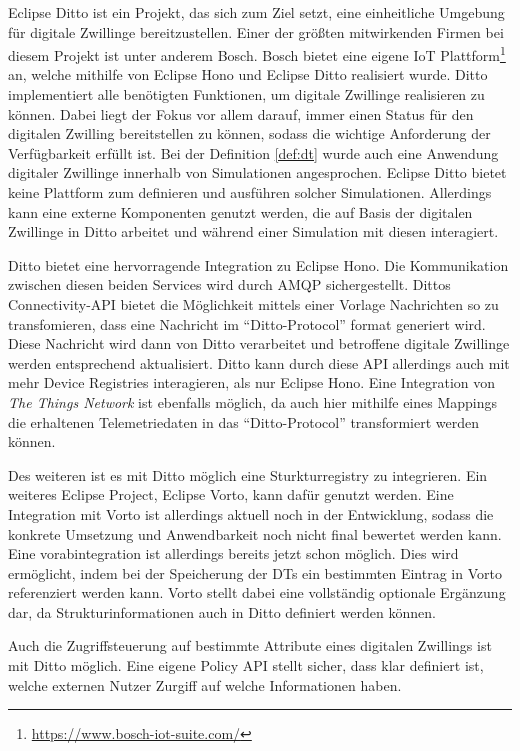 Eclipse Ditto ist ein Projekt, das sich zum Ziel setzt, eine einheitliche Umgebung für digitale Zwillinge bereitzustellen. Einer der größten mitwirkenden Firmen bei diesem Projekt ist unter anderem Bosch. Bosch bietet eine eigene IoT Plattform\footnote{\url{https://www.bosch-iot-suite.com/}} an, welche mithilfe von Eclipse Hono und Eclipse Ditto realisiert wurde. Ditto implementiert alle benötigten Funktionen, um digitale Zwillinge realisieren zu können. Dabei liegt der Fokus vor allem darauf, immer einen Status für den digitalen Zwilling bereitstellen zu können, sodass die wichtige Anforderung der Verfügbarkeit erfüllt ist. Bei der Definition \vref{def:dt} wurde auch eine Anwendung digitaler Zwillinge innerhalb von Simulationen angesprochen. Eclipse Ditto bietet keine Plattform zum definieren und ausführen solcher Simulationen. Allerdings kann eine externe Komponenten genutzt werden, die auf Basis der digitalen Zwillinge in Ditto arbeitet und während einer Simulation mit diesen interagiert.

Ditto bietet eine hervorragende Integration zu Eclipse Hono. Die Kommunikation zwischen diesen beiden Services wird durch \ac{AMQP} sichergestellt. Dittos Connectivity-API bietet die Möglichkeit mittels einer Vorlage Nachrichten so zu transfomieren, dass eine Nachricht im \enquote{Ditto-Protocol} format generiert wird. Diese Nachricht wird dann von Ditto verarbeitet und betroffene digitale Zwillinge werden entsprechend aktualisiert. Ditto kann durch diese API allerdings auch mit mehr Device Registries interagieren, als nur Eclipse Hono. Eine Integration von \textit{The Things Network} ist ebenfalls möglich, da auch hier mithilfe eines Mappings die erhaltenen Telemetriedaten in das \enquote{Ditto-Protocol} transformiert werden können.

Des weiteren ist es mit Ditto möglich eine Sturkturregistry zu integrieren. Ein weiteres Eclipse Project, Eclipse Vorto, kann dafür genutzt werden. Eine Integration mit Vorto ist allerdings aktuell noch in der Entwicklung, sodass die konkrete Umsetzung und Anwendbarkeit noch nicht final bewertet werden kann. Eine vorabintegration ist allerdings bereits jetzt schon möglich. Dies wird ermöglicht, indem bei der Speicherung der \ac{DT}s ein bestimmten Eintrag in Vorto referenziert werden kann. Vorto stellt dabei eine vollständig optionale Ergänzung dar, da Strukturinformationen auch in Ditto definiert werden können. 

Auch die Zugriffsteuerung auf bestimmte Attribute eines digitalen Zwillings ist mit Ditto möglich. Eine eigene Policy API stellt sicher, dass klar definiert ist, welche externen Nutzer Zurgiff auf welche Informationen haben. 

